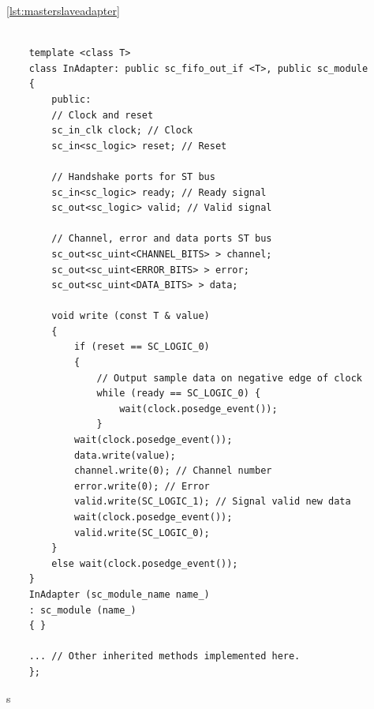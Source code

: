\ref{lst:masterslaveadapter}
\begin{lstlisting}[style=customc++, caption=Adapter..,
label={lst:masterslaveadapter}]
	
	template <class T>
	class InAdapter: public sc_fifo_out_if <T>, public sc_module
	{
		public:
		// Clock and reset
		sc_in_clk clock; // Clock
		sc_in<sc_logic> reset; // Reset
	
		// Handshake ports for ST bus
		sc_in<sc_logic> ready; // Ready signal
		sc_out<sc_logic> valid; // Valid signal
	
		// Channel, error and data ports ST bus
		sc_out<sc_uint<CHANNEL_BITS> > channel;
		sc_out<sc_uint<ERROR_BITS> > error;
		sc_out<sc_uint<DATA_BITS> > data;
	
		void write (const T & value)
		{
			if (reset == SC_LOGIC_0)
			{
				// Output sample data on negative edge of clock
				while (ready == SC_LOGIC_0)	{
					wait(clock.posedge_event());
				}
			wait(clock.posedge_event());
			data.write(value);
			channel.write(0); // Channel number
			error.write(0); // Error
			valid.write(SC_LOGIC_1); // Signal valid new data
			wait(clock.posedge_event());
			valid.write(SC_LOGIC_0);
		}
		else wait(clock.posedge_event());
	}
	InAdapter (sc_module_name name_)
	: sc_module (name_)
	{ }
	
	... // Other inherited methods implemented here.
	};
\end{lstlisting}
















s











